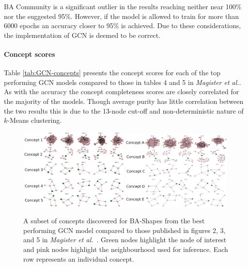 BA Community is a significant outlier in the results reaching neither near 100\% nor the suggested 95\%.
However, if the model is allowed to train for more than 6000 epochs an accuracy closer to 95\% is achieved.
Due to these considerations, the implementation of GCN is deemed to be correct.

\paragraph{Concept scores}

Table \ref{tab:GCN-concepts} presents the concept scores for each of the top performing GCN models compared to those in tables 4 and 5 in \textit{Magister et al.}.
As with the accuracy the concept completeness scores are closely correlated for the majority of the models.
%
Though average purity has little correlation between the two results this is due to the 13-node cut-off and non-deterministic nature of $k$-Means clustering.


\begin{figure}
    \centering
    \includegraphics[width=0.49\textwidth]{figures/GCN-BA-Shapes}
    \includegraphics[width=0.49\textwidth]{figures/Magister-BA-Shapes}
    \caption{A subset of concepts discovered for BA-Shapes from the best performing GCN model compared to those published in figures 2, 3, and 5 in \textit{Magister et al.}~\cite{magister2021gcexplainer}. Green nodes highlight the node of interest and pink nodes highlight the neighbourhood used for inference. Each row represents an individual concept.}
    \label{fig:GCN-BA-Shapes}
\end{figure}

